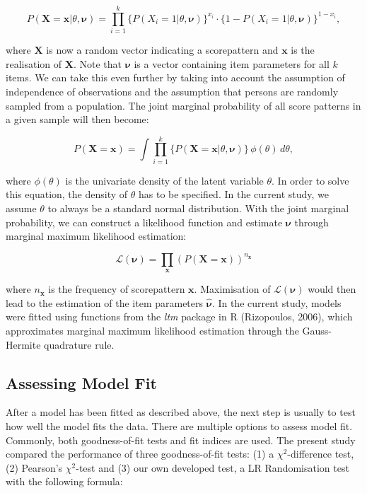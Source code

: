 \documentclass[Royal,sageapa,times,doublespace]{sagej}
\begin{document}
\begin{equation}
P(\boldsymbol{X} = \boldsymbol{x} | \theta, \boldsymbol{\nu}) = \prod_{i=1}^{k} \{P(X_i = 1 | \theta, \boldsymbol{\nu})\}^{x_i} \cdot  \{1 - P(X_i = 1 | \theta, \boldsymbol{\nu}) \}^{1 - x_i},
\end{equation}

where $\boldsymbol{X}$ is now a random vector indicating a scorepattern and $\boldsymbol{x}$ is the realisation of $\boldsymbol{X}$. Note that $\boldsymbol{\nu}$ is a vector containing item parameters for all $k$ items. We can take this even further by taking into account the assumption of independence of observations and the assumption that persons are randomly sampled from a population. The joint marginal probability of all score patterns in a given sample will then become:

\begin{equation}
P(\boldsymbol{X} = \boldsymbol{x}) = \int \prod_{i=1}^{k} \{ P(\boldsymbol{X} = \boldsymbol{x} | \theta, \boldsymbol{\nu}) \} \,\phi(\theta)\,d\theta,
\end{equation}

where $\phi(\theta)$ is the univariate density of the latent variable $\theta$. In order to solve this equation, the density of $\theta$ has to be specified. In the current study, we assume $\theta$ to always be a standard normal distribution. With the joint marginal probability, we can construct a likelihood function and estimate $\boldsymbol{\nu}$ through marginal maximum likelihood estimation:

\begin{equation}
\mathcal{L}(\boldsymbol{\nu}) = \prod_{\boldsymbol{x}} (P(\boldsymbol{X} = \boldsymbol{x}))^{n_{\boldsymbol{x}}}
\end{equation}

where $n_{\boldsymbol{x}}$ is the frequency of scorepattern $\boldsymbol{x}$. Maximisation of $\mathcal{L}(\boldsymbol{\nu})$ would then lead to the estimation of the item parameters $\boldsymbol{\hat{\nu}}$. In the current study, models were fitted using functions from the \textit{ltm} package in R (Rizopoulos, 2006), which approximates marginal maximum likelihood estimation through the Gauss-Hermite quadrature rule.
\subsection{Assessing Model Fit}
\indent After a model has been fitted as described above, the next step is usually to test how well the model fits the data. There are multiple options to assess model fit. Commonly, both goodness-of-fit tests and fit indices are used. The present study compared the performance of three goodness-of-fit tests: (1) a $\chi^2$-difference test, (2) Pearson's $\chi^2$-test and (3) our own developed test, a LR Randomisation test with the following formula:
\end{document}
